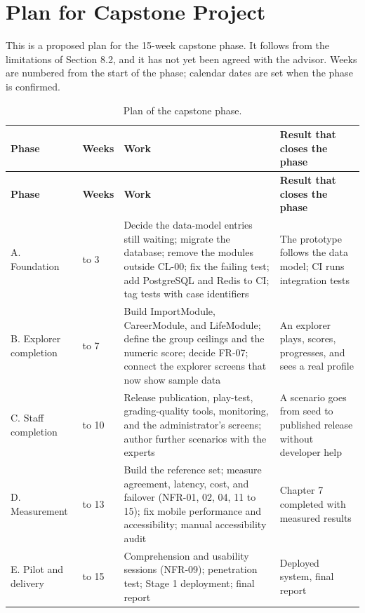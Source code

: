 \newpage
\section*{Plan for Capstone Project}

This is a proposed plan for the 15-week capstone phase. It follows from the limitations of Section 8.2, and it has not yet been agreed with the advisor. Weeks are numbered from the start of the phase; calendar dates are set when the phase is confirmed.

{\small{}\renewcommand{\arraystretch}{1.1}
\begin{longtable}{|>{\raggedright\arraybackslash}p{}|>{\raggedright\arraybackslash}p{}|>{\raggedright\arraybackslash}p{}|>{\raggedright\arraybackslash}p{}|}
\caption{Plan of the capstone phase.} \\
\hline
\textbf{Phase} & \textbf{Weeks} & \textbf{Work} & \textbf{Result that closes the phase} \\ \hline
\endfirsthead
\hline
\textbf{Phase} & \textbf{Weeks} & \textbf{Work} & \textbf{Result that closes the phase} \\ \hline
\endhead
A. Foundation & 1 to 3 & Decide the data-model entries still waiting; migrate the database; remove the modules outside CL-00; fix the failing test; add PostgreSQL and Redis to CI; tag tests with case identifiers & The prototype follows the data model; CI runs integration tests \\ \hline
B. Explorer completion & 4 to 7 & Build ImportModule, CareerModule, and LifeModule; define the group ceilings and the numeric score; decide FR-07; connect the explorer screens that now show sample data & An explorer plays, scores, progresses, and sees a real profile \\ \hline
C. Staff completion & 8 to 10 & Release publication, play-test, grading-\allowbreak{}quality tools, monitoring, and the administrator's screens; author further scenarios with the experts & A scenario goes from seed to published release without developer help \\ \hline
D. Measurement & 11 to 13 & Build the reference set; measure agreement, latency, cost, and failover (NFR-01, 02, 04, 11 to 15); fix mobile performance and accessibility; manual accessibility audit & Chapter 7 completed with measured results \\ \hline
E. Pilot and delivery & 14 to 15 & Comprehension and usability sessions (NFR-09); penetration test; Stage 1 deployment; final report & Deployed system, final report \\ \hline
\end{longtable}
}

